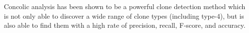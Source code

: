 \documentclass{sig-alternate}
\newcommand{\todo}[1]{\textcolor{cyan}{\textbf{[#1]}}}
\begin{document}

Concolic analysis has been shown to be a powerful clone detection method which is not only able to discover a wide range of clone types (including type-4), but is also able to find them with a high rate of precision, recall, F-score, and accuracy.






\end{document}
